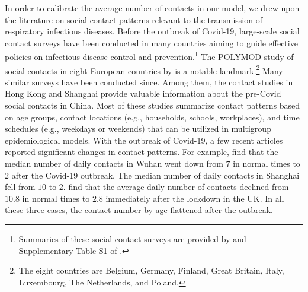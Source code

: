 \documentclass[12pt]{article}
\begin{document}
In order to calibrate the average number of contacts in our model, we drew
upon the literature on social contact patterns relevant to the transmission of
respiratory infectious diseases. Before the outbreak of Covid-19, large-scale
social contact surveys have been conducted in many countries aiming to guide
effective policies on infectious disease control and
prevention.\footnote{Summaries of these social contact surveys are provided by
\cite{Hoang2019review} and Supplementary Table S1 of \cite{Leung2017contactHK}%
.} The POLYMOD study of social contacts in eight European countries by
\cite{Mossong2008} is a notable landmark.\footnote{The eight countries are
Belgium, Germany, Finland, Great Britain, Italy, Luxembourg, The Netherlands,
and Poland.} Many similar surveys have been conducted since. Among them, the
contact studies in Hong Kong
\citep{Leung2017contactHK}
and Shanghai
\citep{Zhang2019contactSH}
provide valuable information about the pre-Covid social contacts in China.
Most of these studies summarize contact patterns based on age groups, contact
locations (e.g., households, schools, workplaces), and time schedules (e.g.,
weekdays or weekends) that can be utilized in multigroup epidemiological
models. With the outbreak of Covid-19, a few recent articles reported
significant changes in contact patterns. For example, \cite{Zhang2020science}
find that the median number of daily contacts in Wuhan went down from $7$ in
normal times to $2$ after the Covid-19 outbreak. The median number of daily
contacts in Shanghai fell from $10$ to $2$. \cite{Jarvis2020UK} find that the
average daily number of contacts declined from $10.8$ in normal times to $2.8$
immediately after the lockdown in the UK. In all these three cases, the
contact number by age flattened after the outbreak.
\end{document}
